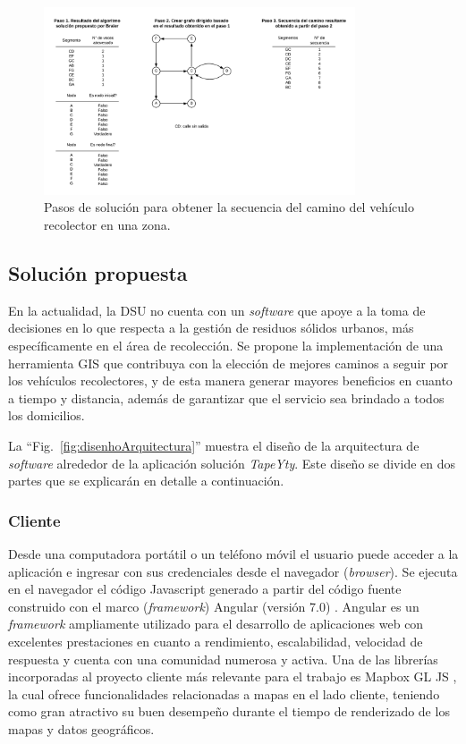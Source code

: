 \documentclass[conference]{IEEEtran}
\begin{document}
\begin{figure}[htbp]
\centerline{\includegraphics[width=0.82\textwidth]{imagenes/pasos_de_solucion.png}}
\caption{Pasos de solución para obtener la secuencia del camino del vehículo recolector en una zona.}
\label{fig:PasosSolucion}
\end{figure}

\subsection{Solución propuesta}

En la actualidad, la DSU no cuenta con un \textit{software} que apoye a la toma de decisiones en lo que respecta a la gestión de residuos sólidos urbanos, más específicamente en el área de recolección. Se propone la implementación de una herramienta GIS que contribuya con la elección de mejores caminos a seguir por los vehículos recolectores, y de esta manera generar mayores beneficios en cuanto a tiempo y distancia, además de garantizar que el servicio sea brindado a todos los domicilios.

La ``Fig.~\ref{fig:disenhoArquitectura}'' muestra el diseño de la arquitectura de \textit{software} alrededor de la aplicación solución \textit{TapeYty}. Este diseño se divide en dos partes que se explicarán en detalle a continuación.

\subsubsection{Cliente}

Desde una computadora portátil o un teléfono móvil el usuario puede acceder a la aplicación e ingresar con sus credenciales desde el navegador (\textit{browser}). Se ejecuta en el navegador el código Javascript generado a partir del código fuente construido con el marco (\textit{framework}) Angular (versión 7.0) \cite{Angular}. Angular es un \textit{framework} ampliamente utilizado para el desarrollo de aplicaciones web con excelentes prestaciones en cuanto a rendimiento, escalabilidad, velocidad de respuesta y cuenta con una comunidad numerosa y activa. Una de las librerías incorporadas al proyecto cliente más relevante para el trabajo es Mapbox GL JS \cite{MapboxJS}, la cual ofrece funcionalidades relacionadas a mapas en el lado cliente, teniendo como gran atractivo su buen desempeño durante el tiempo de renderizado de los mapas y datos geográficos.
\end{document}

